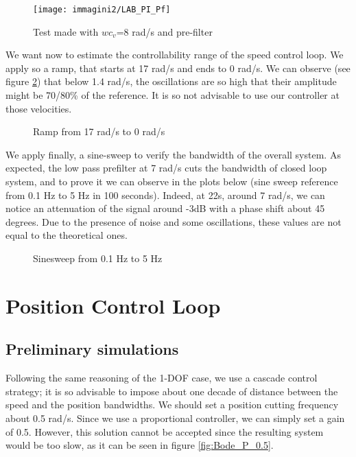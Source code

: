 \begin{figure}[h]
	\centering
	\texttt{[image: immagini2/LAB\_PI\_Pf]}
	\caption{Test made with $wc_{v}$=8 rad/s and pre-filter}
	\label{fig:LAB_PI_8}
\end{figure}

We want now to estimate the controllability range of the speed control loop. We apply so a ramp, that starts at 17 rad/s and ends to 0 rad/s.  We can observe (see figure \ref{fig:Ramp_PI}) that below 1.4 rad/s, the oscillations are so high that their amplitude might be 70/80\% of the reference. It is so not advisable to use our controller at those velocities.

\begin{figure}[h]
	\centering
	\quad
	\caption{Ramp from 17 rad/s to 0 rad/s}
	\label{fig:Ramp_PI}
\end{figure}

We apply finally, a sine-sweep to verify the bandwidth of the overall system. As expected, the low pass prefilter at 7 rad/s cuts the bandwidth of closed loop system, and to prove it we can observe in the plots below (sine sweep reference from 0.1 Hz to 5 Hz in 100 seconds). Indeed, at 22s, around 7 rad/s, we can notice an attenuation of the signal around -3dB with a phase shift about 45 degrees. Due to the presence of noise and some oscillations, these values are not equal to the theoretical ones.

\begin{figure}[h]
	\centering
	\caption{Sinesweep from 0.1 Hz  to 5 Hz}
	\label{fig:Sine_PI}
\end{figure}

\section{Position Control Loop}
\subsection{Preliminary simulations}
Following the same reasoning of the 1-DOF case, we use a cascade control strategy; it is so advisable to impose about one decade of distance between the speed and the position bandwidths. We should set a position cutting frequency about 0.5 rad/s. Since we use a proportional controller, we can simply set a gain of 0.5. However, this solution cannot be accepted since the resulting system would be too slow, as it can be seen in figure \ref{fig:Bode_P_0.5}.


